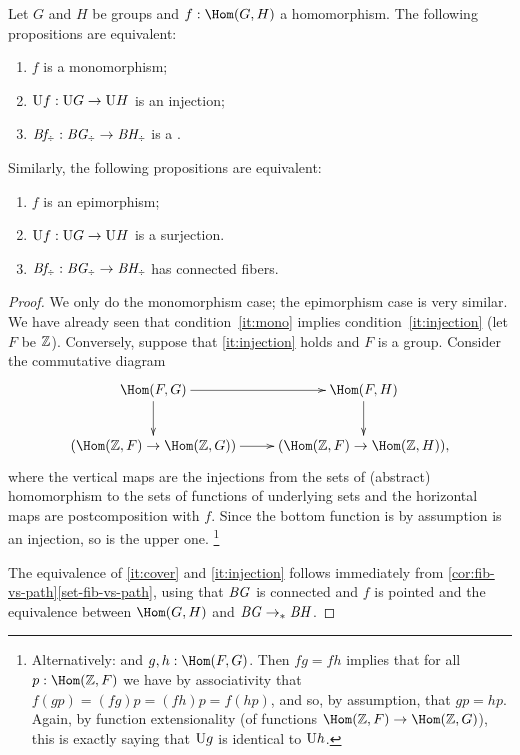 \begin{lemma}\label{lem:eq-mono-cover}
Let $G$ and $H$ be groups and $f: \Hom(G,H)$ a homomorphism.
The following propositions are equivalent:\label{lem:eq-epi-conn}
\begin{enumerate}
\item\label{it:mono} $f$ is a monomorphism;
\item\label{it:injection} $\mathrm{U} f:\mathrm{U} G\to\mathrm{U} H$ is an injection;
\item\label{it:cover} $\Bf_\div:\BG_\div\to \BH_\div$ is a \covering.
\end{enumerate}

Similarly, the following propositions are equivalent:
\begin{enumerate}[label=(\arabic*')]
\item\label{it:epi} $f$ is an epimorphism;
\item\label{it:surjection} $\mathrm{U} f:\mathrm{U} G\to\mathrm{U} H$ is a surjection.
\item\label{it:connfib} $\Bf_\div:\BG_\div\to \BH_\div$ has connected fibers.
\end{enumerate}
\end{lemma}
\begin{proof}
  We only do the monomorphism case; the epimorphism case is very similar.
  We have already seen that condition~\ref{it:mono} implies  condition~\ref{it:injection} (let $F$ be $\mathbb{Z}$).
    Conversely, suppose that \ref{it:injection} holds and $F$ is a group.  Consider the commutative diagram
$$\xymatrix{\Hom(F,G)\ar[r]\ar[d]&\Hom(F,H)\ar[d]\\
  (\Hom(\ZZ,F)\to\Hom(\ZZ,G))\ar[r]&(\Hom(\ZZ,F)\to\Hom(\ZZ,H)),}$$
where the vertical maps are the injections from the sets of (abstract) homomorphism to the sets of functions of underlying sets and the horizontal maps are postcomposition with $f$.  Since the bottom function is by assumption is an injection, so is the upper one.
\footnote{ Alternatively:  and $g,h:\Hom(F,G)$.  Then $fg=fh$ implies that for all $p:\Hom(\ZZ,F)$ we have by associativity that $f(gp)=(fg)p=(fh)p=f(hp)$, and so, by assumption, that $gp=hp$.
  Again, by function extensionality (of functions $\Hom(\ZZ,F)\to\Hom(\ZZ,G)$), this is exactly saying that $\mathrm{U} g$ is identical to $\mathrm{U} h$.}

  The equivalence of \ref{it:cover} and \ref{it:injection} follows
immediately from \cref{cor:fib-vs-path}\ref{set-fib-vs-path}, using
that $\mathit{B}\mathit{G}$ is connected and $f$ is pointed and the equivalence between $\Hom(G,H)$ and $\mathit{B}\mathit{G}\to_\ast \mathit{B}\mathit{H}$.
\end{proof}



